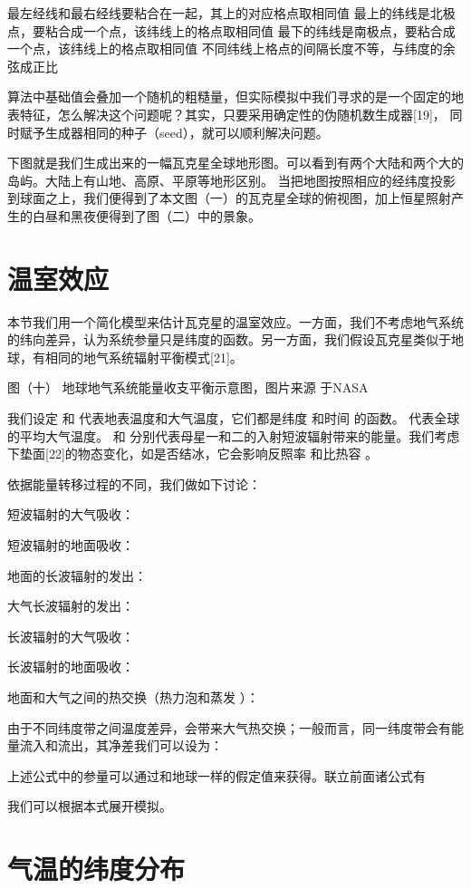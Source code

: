 \documentclass[a4paper,10.5pt]{book}
\begin{document}
最左经线和最右经线要粘合在一起，其上的对应格点取相同值
最上的纬线是北极点，要粘合成一个点，该纬线上的格点取相同值
最下的纬线是南极点，要粘合成一个点，该纬线上的格点取相同值
不同纬线上格点的间隔长度不等，与纬度的余弦成正比

算法中基础值会叠加一个随机的粗糙量，但实际模拟中我们寻求的是一个固定的地表特征，怎么解决这个问题呢？其实，只要采用确定性的伪随机数生成器[19]，
同时赋予生成器相同的种子（seed），就可以顺利解决问题。

下图就是我们生成出来的一幅瓦克星全球地形图。可以看到有两个大陆和两个大的岛屿。大陆上有山地、高原、平原等地形区别。
当把地图按照相应的经纬度投影到球面之上，我们便得到了本文图（一）的瓦克星全球的俯视图，加上恒星照射产生的白昼和黑夜便得到了图（二）中的景象。

\section{温室效应}

本节我们用一个简化模型来估计瓦克星的温室效应。一方面，我们不考虑地气系统的纬向差异，认为系统参量只是纬度的函数。另一方面，我们假设瓦克星类似于地球，有相同的地气系统辐射平衡模式[21]。


图（十）
地球地气系统能量收支平衡示意图，图片来源 于NASA

我们设定  和  代表地表温度和大气温度，它们都是纬度  和时间  的函数。   代表全球的平均大气温度。 和   分别代表母星一和二的入射短波辐射带来的能量。我们考虑下垫面[22]的物态变化，如是否结冰，它会影响反照率  和比热容  。

依据能量转移过程的不同，我们做如下讨论：

短波辐射的大气吸收：

短波辐射的地面吸收：

地面的长波辐射的发出：

大气长波辐射的发出：

长波辐射的大气吸收：

长波辐射的地面吸收：

地面和大气之间的热交换（热力泡和蒸发 ）：

由于不同纬度带之间温度差异，会带来大气热交换；一般而言，同一纬度带会有能量流入和流出，其净差我们可以设为：

上述公式中的参量可以通过和地球一样的假定值来获得。联立前面诸公式有

我们可以根据本式展开模拟。


\section{气温的纬度分布}
\end{document}
